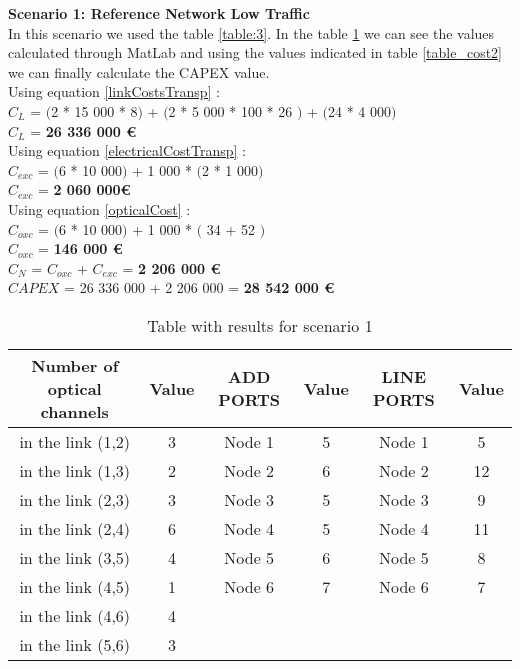 \textbf{Scenario 1: Reference Network Low Traffic} \label{Scenario1_transp} \\

In this scenario we used the table \ref{table:3}. In the table \ref{result_ILP1_T} we can see the values calculated through MatLab and using the values indicated in table \ref{table_cost2} we can finally calculate the CAPEX value. \\

Using equation \ref{linkCostsTransp} : \\
$C_L$ = $($2 * 15 000 * 8$)$ + $($2 * 5 000 * 100 * 26 $)$ + $($24 * 4 000$)$ \\
$C_L$ = \textbf{26 336 000 \euro} \\

Using equation \ref{electricalCostTransp} : \\
$C_{exc}$ = $($6 * 10 000$)$ + 1 000 * $($2 * 1 000$)$ \\
$C_{exc}$ = \textbf{2 060 000\euro} \\

Using equation \ref{opticalCost} : \\
$C_{oxc}$ = $($6 * 10 000$)$ + 1 000 * $($ 34 + 52 $)$ \\
$C_{oxc}$ = \textbf{146 000 \euro} \\
$C_N$ = $C_{oxc}$ + $C_{exc}$ = \textbf{2 206 000 \euro} \\

$CAPEX$ = 26 336 000 + 2 206 000 = \textbf{28 542 000 \euro}\\

\begin{table}[h!]
\centering
\begin{tabular}{|| c | c || c | c || c | c ||}
 \hline
 Number of optical channels & Value & ADD PORTS & Value & LINE PORTS & Value \\
 \hline\hline
 in the link (1,2) & 3 & Node 1 & 5 & Node 1 & 5 \\
 in the link (1,3) & 2 & Node 2 & 6 & Node 2 & 12 \\
 in the link (2,3) & 3 & Node 3 & 5 & Node 3 & 9 \\
 in the link (2,4) & 6 & Node 4 & 5 & Node 4 & 11 \\
 in the link (3,5) & 4 & Node 5 & 6 & Node 5 & 8 \\
 in the link (4,5) & 1 & Node 6 & 7 & Node 6 & 7 \\
 in the link (4,6) & 4 & & & & \\
 in the link (5,6) & 3 & & & & \\
 \hline
\end{tabular}
\caption{Table with results for scenario 1}
\label{result_ILP1_T}
\end{table}


